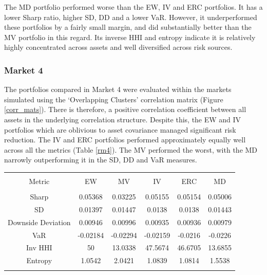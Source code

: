 \documentclass[11pt,preprint, authoryear]{elsarticle}
\let\origtable\table
\let\endorigtable\endtable
\renewenvironment{table}[1][2] {
    \expandafter\origtable\expandafter[H]
} {
    \endorigtable
}
\numberwithin{equation}{section}
\numberwithin{figure}{section}
\numberwithin{table}{section}
\begin{document}
The MD portfolio performed worse than the EW, IV and ERC portfolios. It
has a lower Sharp ratio, higher SD, DD and a lower VaR. However, it
underperformed these portfolios by a fairly small margin, and did
substantially better than the MV portfolio in this regard. Its inverse
HHI and entropy indicate it is relatively highly concentrated across
assets and well diversified across risk sources.

\hypertarget{market-4}{%
\subsubsection{Market 4}\label{market-4}}

The portfolios compared in Market 4 were evaluated within the markets
simulated using the `Overlapping Clusters' correlation matrix (Figure
\ref{corr_mats}). There is therefore, a positive correlation coefficient
between all assets in the underlying correlation structure. Despite
this, the EW and IV portfolios which are oblivious to asset covariance
managed significant risk reduction. The IV and ERC portfolios performed
approximately equally well across all the metrics (Table \ref{rm4}). The
MV performed the worst, with the MD narrowly outperforming it in the SD,
DD and VaR measures.

\begin{table}[!htbp] \centering 
  \caption{Market 4 - Portfolio Risk Metrics} 
  \label{rm4} 
\begin{tabular}{@{\extracolsep{5pt}} cccccc} 
\\[-1.8ex]\hline 
\hline \\[-1.8ex] 
Metric & EW & MV & IV & ERC & MD \\ 
\hline \\[-1.8ex] 
Sharp & 0.05368 & 0.03225 & 0.05155 & 0.05154 & 0.05006 \\ 
SD & 0.01397 & 0.01447 & 0.0138 & 0.0138 & 0.01443 \\ 
Downside Deviation & 0.00946 & 0.00996 & 0.00935 & 0.00936 & 0.00979 \\ 
VaR & -0.02184 & -0.02294 & -0.02159 & -0.0216 & -0.0226 \\ 
Inv HHI & 50 & 13.0338 & 47.5674 & 46.6705 & 13.6855 \\ 
Entropy & 1.0542 & 2.0421 & 1.0839 & 1.0814 & 1.5538 \\ 
\hline \\[-1.8ex] 
\end{tabular} 
\end{table}
\end{document}
